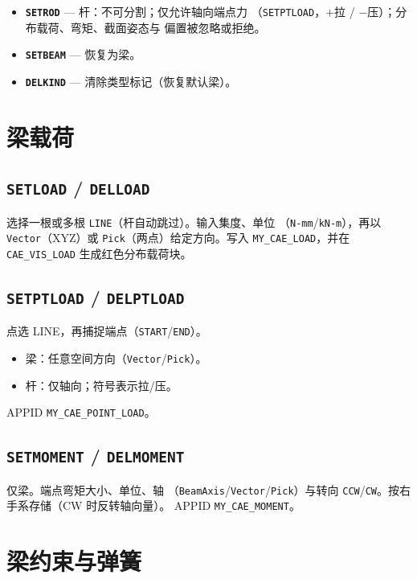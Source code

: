 \documentclass[a4paper]{ltxdoc}
\newcommand{\cadcmd}[1]{\texttt{\textbf{#1}}}
\newcommand{\appid}[1]{\texttt{#1}}
\begin{document}
\begin{itemize}[nosep]
  \item \cadcmd{SETROD} --- 杆：不可分割；仅允许轴向端点力
        （\texttt{SETPTLOAD}，$+$拉 / $-$压）；分布载荷、弯矩、截面姿态与
        偏置被忽略或拒绝。
  \item \cadcmd{SETBEAM} --- 恢复为梁。
  \item \cadcmd{DELKIND} --- 清除类型标记（恢复默认梁）。
\end{itemize}

\section{梁载荷}

\subsection{\cadcmd{SETLOAD} / \cadcmd{DELLOAD}}
选择一根或多根 \texttt{LINE}（杆自动跳过）。输入集度、单位
（\texttt{N-mm}/\texttt{kN-m}），再以 \texttt{Vector}（XYZ）或
\texttt{Pick}（两点）给定方向。写入 \appid{MY\_CAE\_LOAD}，并在
\texttt{CAE\_VIS\_LOAD} 生成红色分布载荷块。

\subsection{\cadcmd{SETPTLOAD} / \cadcmd{DELPTLOAD}}
点选 LINE，再捕捉端点（\texttt{START}/\texttt{END}）。
\begin{itemize}[nosep]
  \item 梁：任意空间方向（\texttt{Vector}/\texttt{Pick}）。
  \item 杆：仅轴向；符号表示拉/压。
\end{itemize}
APPID \appid{MY\_CAE\_POINT\_LOAD}。

\subsection{\cadcmd{SETMOMENT} / \cadcmd{DELMOMENT}}
仅梁。端点弯矩大小、单位、轴
（\texttt{BeamAxis}/\texttt{Vector}/\texttt{Pick}）与转向
\texttt{CCW}/\texttt{CW}。按右手系存储（CW 时反转轴向量）。
APPID \appid{MY\_CAE\_MOMENT}。

\section{梁约束与弹簧}
\end{document}
